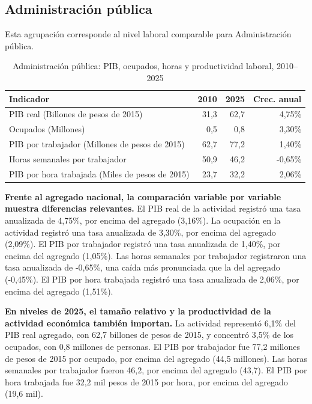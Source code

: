 \subsection{Administración pública}

Esta agrupación corresponde al nivel laboral comparable para Administración pública.

\begin{table}[H]
\centering
\caption{Administración pública: PIB, ocupados, horas y productividad laboral, 2010--2025}
\label{tab:agg25_o_productividad}
\small
\begin{tabular}{lrrr}
\toprule
Indicador & 2010 & 2025 & Crec. anual \\
\midrule
PIB real  (Billones de pesos de 2015) & 31,3 & 62,7 & 4,75\% \\
Ocupados (Millones) & 0,5 & 0,8 & 3,30\% \\
PIB por trabajador (Millones de pesos de 2015) & 62,7 & 77,2 & 1,40\% \\
Horas semanales por trabajador & 50,9 & 46,2 & -0,65\% \\
PIB por hora trabajada (Miles de pesos de 2015) & 23,7 & 32,2 & 2,06\% \\
\bottomrule
\end{tabular}
\end{table}

\textbf{Frente al agregado nacional, la comparación variable por variable muestra diferencias relevantes.} El PIB real de la actividad registró una tasa anualizada de 4,75\%, por encima del agregado (3,16\%). La ocupación en la actividad registró una tasa anualizada de 3,30\%, por encima del agregado (2,09\%). El PIB por trabajador registró una tasa anualizada de 1,40\%, por encima del agregado (1,05\%). Las horas semanales por trabajador registraron una tasa anualizada de -0,65\%, una caída más pronunciada que la del agregado (-0,45\%). El PIB por hora trabajada registró una tasa anualizada de 2,06\%, por encima del agregado (1,51\%).

\textbf{En niveles de 2025, el tamaño relativo y la productividad de la actividad económica también importan.} La actividad representó 6,1\% del PIB real agregado, con 62,7 billones de pesos de 2015, y concentró 3,5\% de los ocupados, con 0,8 millones de personas. El PIB por trabajador fue 77,2 millones de pesos de 2015 por ocupado, por encima del agregado (44,5 millones). Las horas semanales por trabajador fueron 46,2, por encima del agregado (43,7). El PIB por hora trabajada fue 32,2 mil pesos de 2015 por hora, por encima del agregado (19,6 mil).


